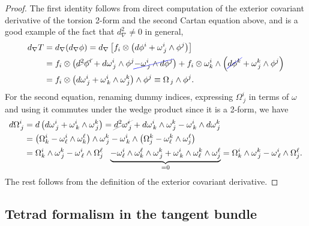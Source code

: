 \documentclass[../geometry_main.tex]{subfiles}
\begin{document}
\begin{proof}
The first identity follows from direct computation of the exterior covariant derivative of the torsion 2-form and the second Cartan equation above, and is a good example of the fact that $d_\nabla^2\neq 0$ in general,
\begin{align}
    d_\nabla T &= d_\nabla (d_\nabla \phi) = d_\nabla \left[f_i\otimes \left(d \phi^i + \omega^i_{\, j} \wedge \phi^j \right)\right]
    \\
    &=
    f_i\otimes \left(\graycancel{d^2 \phi^i} + d\omega^i_{\, j} \wedge \phi^j \bluecancel{- \omega^i_{\, j} \wedge d\phi^j}  \right)
    + f_i \otimes \omega^i_k\wedge \left(\bluecancel{d \phi^k} + \omega^k_{\, j} \wedge \phi^j \right) 
    \\
    &=
    f_i \otimes \left( d\omega^i_{\, j} + \omega^i_{\, k} \wedge \omega^k_{\, j} \right) \wedge \phi^j
    \equiv \Omega_{\, j} \wedge \phi^j.
\end{align}
For the second equation, renaming dummy indices, expressing $\Omega^i_{\, j}$ in terms of $\omega$ and using it commutes under the wedge product since it is a 2-form, we have
\begin{align}
    d \Omega_{\,j}^i &= d \left( d \omega^i_{\, j} + \omega^i_{\, k} \wedge \omega^k_{\, j} \right) = \graycancel{d^2 \omega^i_{\, j}} + d\omega^i_{\, k} \wedge \omega^k_{\, j} - \omega^i_{\, k} \wedge d\omega^k_{\, j}
    \\
    &= \big(\Omega^i_k-\omega^i_\ell\wedge \omega^\ell_k\big)\wedge \omega^k_{\, j} - \omega^i_{\, k} \wedge \big(\Omega_j^k-\omega^k_\ell\wedge \omega^\ell_j\big)
    \\
    & = \Omega^i_k \wedge \omega^k_{\, j} - \omega^i_{\, \ell}\wedge \Omega^\ell_j
    \,\,\,\,\underbrace{-\omega^i_\ell\wedge \omega^\ell_k\wedge \omega^k_{\, j}
    + \omega^i_{\, k} \wedge \omega^k_\ell\wedge \omega^\ell_j}_{=0}
    = \Omega^i_k \wedge \omega^k_{\, j} - \omega^i_{\, \ell}\wedge \Omega^\ell_j.
\end{align}
The rest follows from the definition of the exterior covariant derivative.
\end{proof}





\subsection{Tetrad formalism in the tangent bundle}
%
\end{document}

